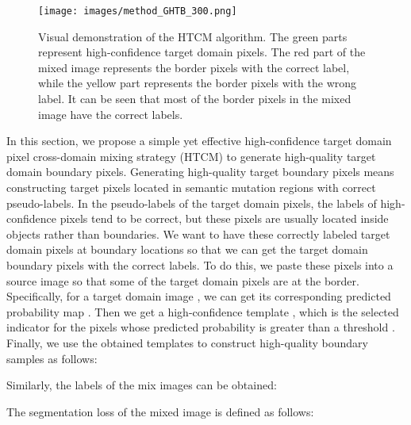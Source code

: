 \documentclass[sigconf]{acmart}
\begin{document}
		\begin{figure}
			\centering
			\texttt{[image: images/method\_GHTB\_300.png]}
			\vspace{-0.25cm}
			\caption{Visual demonstration of the HTCM algorithm. The green parts represent high-confidence target domain pixels. The red part of the mixed image represents the border pixels with the correct label, while the yellow part represents the border pixels with the wrong label. It can be seen that most of the border pixels in the mixed image have the correct labels.}
			\label{figure:method_GHTB}
\end{figure}
		In this section, we propose a simple yet effective high-confidence target domain pixel cross-domain mixing strategy (HTCM) to generate high-quality target domain boundary pixels. 
		Generating high-quality target boundary pixels means constructing target pixels located in semantic mutation regions with correct pseudo-labels. 
		In the pseudo-labels of the target domain pixels, the labels of high-confidence pixels tend to be correct, but these pixels are usually located inside objects rather than boundaries. We want to have these correctly labeled target domain pixels at boundary locations so that we can get the target domain boundary pixels with the correct labels. To do this, we paste these pixels into a source image so that some of the target domain pixels are at the border. Specifically, for a target domain image , we can get its corresponding predicted probability map . Then we get a high-confidence template , which is the selected indicator for the pixels whose predicted probability is greater than a threshold . Finally, we use the obtained templates  to construct high-quality boundary samples as follows:
		
		Similarly, the labels of the mix images can be obtained:
		
		
		The segmentation loss of the mixed image  is defined as follows:
		
\end{document}
